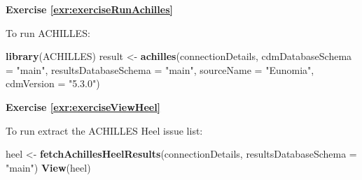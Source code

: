 \documentclass[11pt]{book}
\newenvironment{Shaded}{\begin{snugshade}}{\end{snugshade}}
\newcommand{\DataTypeTok}[1]{\textcolor[rgb]{0.13,0.29,0.53}{#1}}
\newcommand{\KeywordTok}[1]{\textcolor[rgb]{0.13,0.29,0.53}{\textbf{#1}}}
\newcommand{\NormalTok}[1]{#1}
\newcommand{\StringTok}[1]{\textcolor[rgb]{0.31,0.60,0.02}{#1}}
\theoremstyle{definition}
\theoremstyle{definition}
\theoremstyle{definition}
\theoremstyle{remark}
\begin{document}
\textbf{Exercise \ref{exr:exerciseRunAchilles}}

To run ACHILLES:

\begin{Shaded}
\begin{Highlighting}[]
\KeywordTok{library}\NormalTok{(ACHILLES)}
\NormalTok{result <-}\StringTok{ }\KeywordTok{achilles}\NormalTok{(connectionDetails,}
                   \DataTypeTok{cdmDatabaseSchema =} \StringTok{"main"}\NormalTok{,}
                   \DataTypeTok{resultsDatabaseSchema =} \StringTok{"main"}\NormalTok{,}
                   \DataTypeTok{sourceName =} \StringTok{"Eunomia"}\NormalTok{,}
                   \DataTypeTok{cdmVersion =} \StringTok{"5.3.0"}\NormalTok{)}
\end{Highlighting}
\end{Shaded}

\textbf{Exercise \ref{exr:exerciseViewHeel}}

To run extract the ACHILLES Heel issue list:

\begin{Shaded}
\begin{Highlighting}[]
\NormalTok{heel <-}\StringTok{ }\KeywordTok{fetchAchillesHeelResults}\NormalTok{(connectionDetails,}
                                 \DataTypeTok{resultsDatabaseSchema =} \StringTok{"main"}\NormalTok{)}
\KeywordTok{View}\NormalTok{(heel)}
\end{Highlighting}
\end{Shaded}



\backmatter
\printindex
\end{document}

